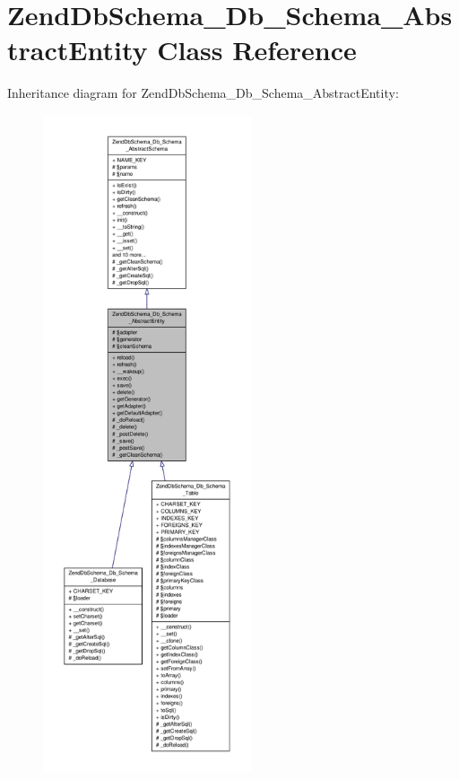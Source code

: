 \hypertarget{classZendDbSchema__Db__Schema__AbstractEntity}{\section{Zend\-Db\-Schema\-\_\-\-Db\-\_\-\-Schema\-\_\-\-Abstract\-Entity Class Reference}
\label{classZendDbSchema__Db__Schema__AbstractEntity}
}


Inheritance diagram for Zend\-Db\-Schema\-\_\-\-Db\-\_\-\-Schema\-\_\-\-Abstract\-Entity\-:\nopagebreak
\begin{figure}[H]
\begin{center}
\leavevmode
\includegraphics[height=550pt]{classZendDbSchema__Db__Schema__AbstractEntity__inherit__graph}
\end{center}
\end{figure}


